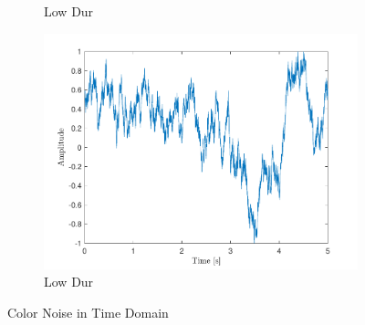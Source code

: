 \documentclass[10pt]{article}
\begin{document}
\begin{figure}[ht]
\begin{subfigure}[b]{0.31\textwidth}
        \caption{Low Dur}
    \end{subfigure}
    \quad
    \begin{subfigure}[b]{0.31\textwidth}
        \includegraphics[width=\textwidth]{problem11_brown_noise_time.pdf}
        \caption{Low Dur}
    \end{subfigure}
    \caption{Color Noise in Time Domain\vspace{-0.5cm}}
    \label{color_noise_time_domain}
\end{figure}
\end{document}
